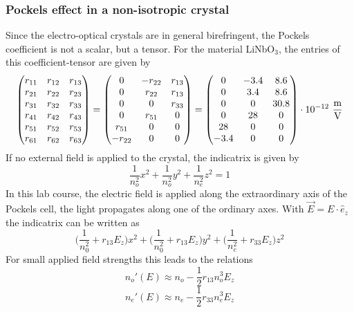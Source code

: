 \subsubsection{Pockels effect in a non-isotropic crystal}
Since the electro-optical crystals are in general birefringent, the
Pockels coefficient is not a scalar, but a tensor. For the material
LiNbO$_3$, the entries of this coefficient-tensor are given by
$$\begin{pmatrix}
    r_{11} & r_{12} & r_{13} \\
    r_{21} & r_{22} & r_{23} \\
    r_{31} & r_{32} & r_{33} \\
    r_{41} & r_{42} & r_{43} \\
    r_{51} & r_{52} & r_{53} \\
    r_{61} & r_{62} & r_{63}
\end{pmatrix}=\begin{pmatrix}
    0 & -r_{22} & r_{13} \\
    0 & r_{22} & r_{13} \\
    0 & 0 & r_{33} \\
    0 & r_{51} & 0 \\
    r_{51} & 0 & 0 \\
    -r_{22} & 0 & 0 \\
\end{pmatrix}=\begin{pmatrix}
    0 & -3.4 & 8.6 \\
    0 & 3.4 & 8.6 \\
    0 & 0 & 30.8 \\
    0 & 28 & 0 \\
    28 & 0 & 0 \\
    -3.4 & 0 & 0
\end{pmatrix}\cdot 10^{-12}\ \frac{\textnormal{m}}{\textnormal{V}}$$
If no external field is applied to the crystal, the indicatrix is given by
\begin{equation}
    \frac{1}{n_o^2}x^2+\frac{1}{n_o^2}y^2+\frac{1}{n_e^2}z^2=1
    \label{indicatrix}
\end{equation}
In this lab course, the electric field is applied along the
extraordinary axis of the Pockels cell, the light propagates along one
of the ordinary axes. With $\vec E=E\cdot\hat e_z$ the indicatrix can be
written as
\begin{equation}
    \bigg(\frac{1}{n_0^2}+r_{13}E_z\bigg)x^2+\bigg(\frac{1}{n_0^2}+
    r_{13}E_z\bigg)y^2+\bigg(\frac{1}{n_e^2}+r_{33}E_z\bigg)z^2
\end{equation}
For small applied field strengths this leads to the relations
\begin{equation}
    n_o'(E)\approx n_o-\frac{1}{2}r_{13}n_o^3E_z
    \label{refractive_index_with_pockels_coefficients1}
\end{equation}\begin{equation}
    n_e'(E)\approx n_e-\frac{1}{2}r_{33}n_e^3E_z
    \label{refractive_index_with_pockels_coefficients2}
\end{equation}

